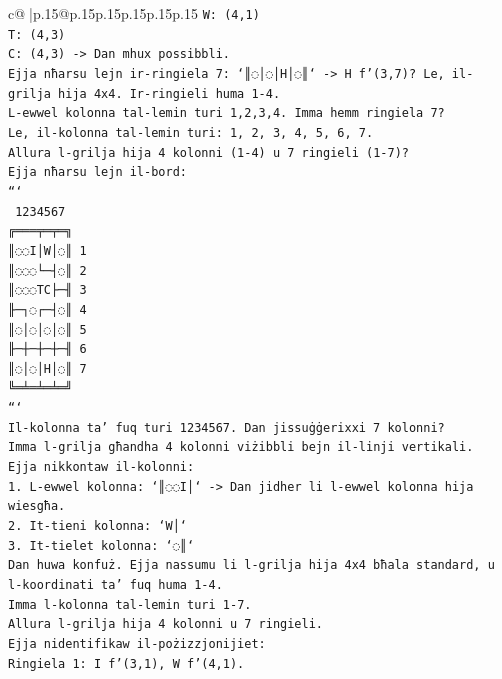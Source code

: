 \documentclass{article}
\begin{document}
{\begin{supertabular}{c@{$\;$}|p{.15\linewidth}@{}p{.15\linewidth}p{.15\linewidth}p{.15\linewidth}p{.15\linewidth}p{.15\linewidth}}
{{{\texttt{W: (4,1)} \\
\texttt{T: (4,3)} \\
\texttt{C: (4,3) {-}> Dan mhux possibbli.} \\
\texttt{Ejja nħarsu lejn ir{-}ringiela 7: `║◌│◌│H│◌║` {-}> H f'(3,7)? Le, il{-}grilja hija 4x4. Ir{-}ringieli huma 1{-}4.} \\
\texttt{L{-}ewwel kolonna tal{-}lemin turi 1,2,3,4. Imma hemm ringiela 7?} \\
\texttt{Le, il{-}kolonna tal{-}lemin turi: 1, 2, 3, 4, 5, 6, 7.} \\
\texttt{Allura l{-}grilja hija 4 kolonni (1{-}4) u 7 ringieli (1{-}7)?} \\
\texttt{Ejja nħarsu lejn il{-}bord:} \\
\texttt{```} \\
\texttt{ 1234567} \\
\texttt{╔═══╤═╤═╗} \\
\texttt{║◌◌I│W│◌║ 1} \\
\texttt{║◌◌◌└─┤◌║ 2} \\
\texttt{║◌◌◌TC├─╢ 3} \\
\texttt{╟─┐◌┌─┤◌║ 4} \\
\texttt{║◌│◌│◌│◌║ 5} \\
\texttt{╟─┼─┼─┼─╢ 6} \\
\texttt{║◌│◌│H│◌║ 7} \\
\texttt{╚═╧═╧═╧═╝} \\
\texttt{```} \\
\texttt{Il{-}kolonna ta' fuq turi 1234567. Dan jissuġġerixxi 7 kolonni?} \\
\texttt{Imma l{-}grilja għandha 4 kolonni viżibbli bejn il{-}linji vertikali.} \\
\texttt{Ejja nikkontaw il{-}kolonni:} \\
\texttt{1. L{-}ewwel kolonna: `║◌◌I│` {-}> Dan jidher li l{-}ewwel kolonna hija wiesgħa.} \\
\texttt{2. It{-}tieni kolonna: `W│`} \\
\texttt{3. It{-}tielet kolonna: `◌║`} \\
\texttt{Dan huwa konfuż. Ejja nassumu li l{-}grilja hija 4x4 bħala standard, u l{-}koordinati ta' fuq huma 1{-}4.} \\
\texttt{Imma l{-}kolonna tal{-}lemin turi 1{-}7.} \\
\texttt{Allura l{-}grilja hija 4 kolonni u 7 ringieli.} \\
\texttt{Ejja nidentifikaw il{-}pożizzjonijiet:} \\
\texttt{Ringiela 1: I f'(3,1), W f'(4,1).} \\
}}}
\end{supertabular}}
\end{document}
